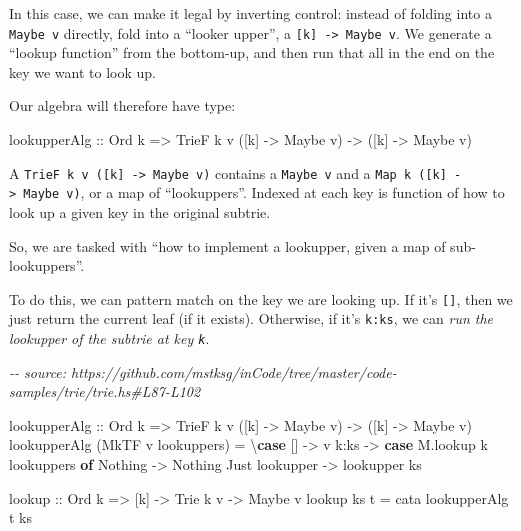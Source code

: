 \documentclass[]{article}
\newenvironment{Shaded}{}{}
\newcommand{\CommentTok}[1]{\textcolor[rgb]{0.38,0.63,0.69}{\textit{#1}}}
\newcommand{\DataTypeTok}[1]{\textcolor[rgb]{0.56,0.13,0.00}{#1}}
\newcommand{\FunctionTok}[1]{\textcolor[rgb]{0.02,0.16,0.49}{#1}}
\newcommand{\KeywordTok}[1]{\textcolor[rgb]{0.00,0.44,0.13}{\textbf{#1}}}
\newcommand{\NormalTok}[1]{#1}
\newcommand{\OperatorTok}[1]{\textcolor[rgb]{0.40,0.40,0.40}{#1}}
\newcommand{\OtherTok}[1]{\textcolor[rgb]{0.00,0.44,0.13}{#1}}
\begin{document}
In this case, we can make it legal by inverting control: instead of folding into
a \texttt{Maybe\ v} directly, fold into a ``looker upper'', a
\texttt{{[}k{]}\ -\textgreater{}\ Maybe\ v}. We generate a ``lookup function''
from the bottom-up, and then run that all in the end on the key we want to look
up.

Our algebra will therefore have type:

\begin{Shaded}
\begin{Highlighting}[]
\NormalTok{lookupperAlg}
\OtherTok{    ::} \DataTypeTok{Ord}\NormalTok{ k}
    \OtherTok{=\textgreater{}} \DataTypeTok{TrieF}\NormalTok{ k v ([k] }\OtherTok{{-}\textgreater{}} \DataTypeTok{Maybe}\NormalTok{ v)}
    \OtherTok{{-}\textgreater{}}\NormalTok{ ([k] }\OtherTok{{-}\textgreater{}} \DataTypeTok{Maybe}\NormalTok{ v)}
\end{Highlighting}
\end{Shaded}

A \texttt{TrieF\ k\ v\ ({[}k{]}\ -\textgreater{}\ Maybe\ v)} contains a
\texttt{Maybe\ v} and a \texttt{Map\ k\ ({[}k{]}\ -\textgreater{}\ Maybe\ v)},
or a map of ``lookuppers''. Indexed at each key is function of how to look up a
given key in the original subtrie.

So, we are tasked with ``how to implement a lookupper, given a map of
sub-lookuppers''.

To do this, we can pattern match on the key we are looking up. If it's
\texttt{{[}{]}}, then we just return the current leaf (if it exists). Otherwise,
if it's \texttt{k:ks}, we can \emph{run the lookupper of the subtrie at key
\texttt{k}}.

\begin{Shaded}
\begin{Highlighting}[]
\CommentTok{{-}{-} source: https://github.com/mstksg/inCode/tree/master/code{-}samples/trie/trie.hs\#L87{-}L102}

\NormalTok{lookupperAlg}
\OtherTok{    ::} \DataTypeTok{Ord}\NormalTok{ k}
    \OtherTok{=\textgreater{}} \DataTypeTok{TrieF}\NormalTok{ k v ([k] }\OtherTok{{-}\textgreater{}} \DataTypeTok{Maybe}\NormalTok{ v)}
    \OtherTok{{-}\textgreater{}}\NormalTok{ ([k] }\OtherTok{{-}\textgreater{}} \DataTypeTok{Maybe}\NormalTok{ v)}
\NormalTok{lookupperAlg (}\DataTypeTok{MkTF}\NormalTok{ v lookuppers) }\OtherTok{=}\NormalTok{ \textbackslash{}}\KeywordTok{case}
\NormalTok{    []   }\OtherTok{{-}\textgreater{}}\NormalTok{ v}
\NormalTok{    k}\OperatorTok{:}\NormalTok{ks }\OtherTok{{-}\textgreater{}} \KeywordTok{case}\NormalTok{ M.lookup k lookuppers }\KeywordTok{of}
      \DataTypeTok{Nothing}        \OtherTok{{-}\textgreater{}} \DataTypeTok{Nothing}
      \DataTypeTok{Just}\NormalTok{ lookupper }\OtherTok{{-}\textgreater{}}\NormalTok{ lookupper ks}

\FunctionTok{lookup}
\OtherTok{    ::} \DataTypeTok{Ord}\NormalTok{ k}
    \OtherTok{=\textgreater{}}\NormalTok{ [k]}
    \OtherTok{{-}\textgreater{}} \DataTypeTok{Trie}\NormalTok{ k v}
    \OtherTok{{-}\textgreater{}} \DataTypeTok{Maybe}\NormalTok{ v}
\FunctionTok{lookup}\NormalTok{ ks t }\OtherTok{=}\NormalTok{ cata lookupperAlg t ks}
\end{Highlighting}
\end{Shaded}
\end{document}
